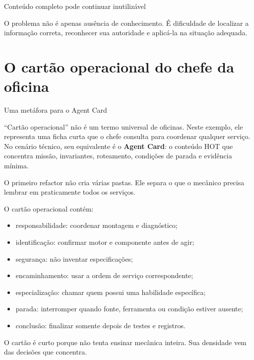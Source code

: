 \documentclass[
  10pt,
  a4paper,
  oneside]{book}
\providecommand{\tightlist}{%
  \setlength{\itemsep}{0pt}\setlength{\parskip}{0pt}}
\begin{document}
\begin{warningbox}{Conteúdo completo pode continuar inutilizável}

O problema não é apenas ausência de conhecimento. É dificuldade de
localizar a informação correta, reconhecer sua autoridade e aplicá-la na
situação adequada.

\end{warningbox}

\hypertarget{o-cartuxe3o-operacional-do-chefe-da-oficina}{%
\section{O cartão operacional do chefe da
oficina}\label{o-cartuxe3o-operacional-do-chefe-da-oficina}}

\begin{infobox}{Uma metáfora para o Agent Card}

``Cartão operacional'' não é um termo universal de oficinas. Neste
exemplo, ele representa uma ficha curta que o chefe consulta para
coordenar qualquer serviço. No cenário técnico, seu equivalente é o
\textbf{Agent Card}: o conteúdo HOT que concentra missão, invariantes,
roteamento, condições de parada e evidência mínima.

\end{infobox}

O primeiro refactor não cria várias pastas. Ele separa o que o mecânico
precisa lembrar em praticamente todos os serviços.

O cartão operacional contém:

\begin{itemize}
\tightlist
\item
  responsabilidade: coordenar montagem e diagnóstico;
\item
  identificação: confirmar motor e componente antes de agir;
\item
  segurança: não inventar especificações;
\item
  encaminhamento: usar a ordem de serviço correspondente;
\item
  especialização: chamar quem possui uma habilidade específica;
\item
  parada: interromper quando fonte, ferramenta ou condição estiver
  ausente;
\item
  conclusão: finalizar somente depois de testes e registros.
\end{itemize}

O cartão é curto porque não tenta ensinar mecânica inteira. Sua
densidade vem das decisões que concentra.
\end{document}
